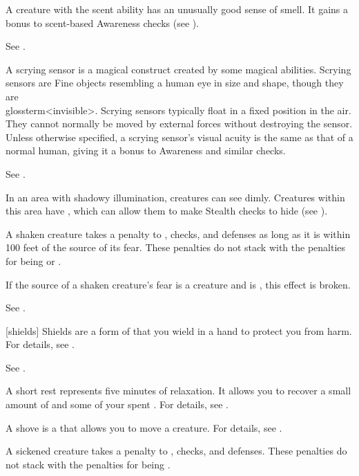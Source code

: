  A creature with the scent ability has an unusually good sense of smell.
It gains a  bonus to scent-based Awareness checks (see ).

 See .

 A scrying sensor is a magical construct created by some magical abilities.
Scrying sensors are Fine objects resembling a human eye in size and shape, though they are \\glossterm<invisible>.
Scrying sensors typically float in a fixed position in the air.
They cannot normally be moved by external forces without destroying the sensor.
Unless otherwise specified, a scrying sensor's visual acuity is the same as that of a normal human, giving it a  bonus to Awareness and similar checks.

 See .

 In an area with shadowy illumination, creatures can see dimly.
Creatures within this area have \concealment, which can allow them to make Stealth checks to hide (see ).

 A shaken creature takes a  penalty to , checks, and defenses as long as it is within 100 feet of the source of its fear.
These penalties do not stack with the penalties for being \frightened or \panicked.

If the source of a shaken creature's fear is a creature and is , this effect is broken.

 See .

[shields] Shields are a form of  that you wield in a hand to protect you from harm.
For details, see .

 See .

 A short rest represents five minutes of relaxation.
It allows you to recover a small amount of  and some of your spent .
For details, see .

 A shove is a  that allows you to move a creature.
For details, see .

 A sickened creature takes a  penalty to , checks, and defenses.
These penalties do not stack with the penalties for being \nauseated.

